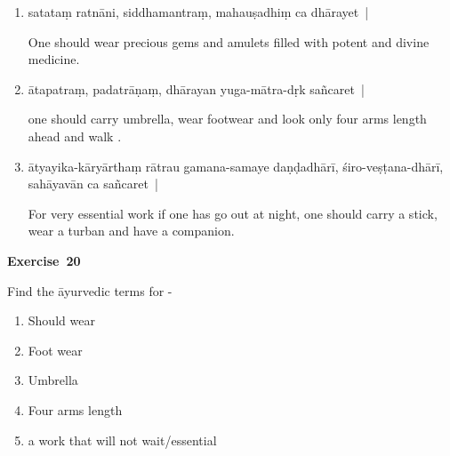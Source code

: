 \begin{enumerate}
\itemsep=0pt
\item {}

satataṃ ratnāni, siddhamantraṃ, mahauṣadhiṃ ca dhārayet~|

One should wear precious gems and amulets filled with potent and divine medicine. 

\item {}

ātapatraṃ, padatrāṇaṃ, dhārayan yuga-mātra-dṛk sañcaret~|

one should carry umbrella, wear footwear and look only four arms length ahead and walk . 

\item {}

ātyayika-kāryārthaṃ rātrau gamana-samaye daṇḍadhārī, śiro-veṣṭana-dhārī, sahāyavān  ca sañcaret~|   

For very essential work if one has go out at night, one should carry a stick, wear a turban and  have a companion.
\end{enumerate}

\centerline{\textbf{Exercise~20}}

Find the āyurvedic terms for -
\begin{enumerate}
\itemsep=0pt
\renewcommand{\theenumi}{\alph{enumi}}
\renewcommand{\labelenumi}{\theenumi.}
\item Should wear 
\item Foot wear 
\item Umbrella 
\item Four arms length
\item a work that will not wait/essential
\end{enumerate}

